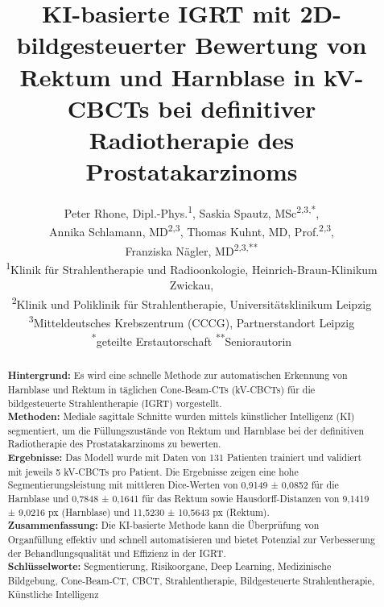 \documentclass{article}
\begin{document}
\title{KI-basierte IGRT mit 2D-bildgesteuerter Bewertung von Rektum und Harnblase in
kV-CBCTs bei definitiver Radiotherapie des Prostatakarzinoms}

\author{%
\begin{minipage}{\textwidth}
\centering
\small
Peter Rhone, Dipl.-Phys.\textsuperscript{1}, 
Saskia Spautz, MSc\textsuperscript{2,3,*},\\ 
Annika Schlamann, MD\textsuperscript{2,3}, 
Thomas Kuhnt, MD, Prof.\textsuperscript{2,3},\\ 
Franziska Nägler, MD\textsuperscript{2,3,**} \\[1ex]
\footnotesize\textsuperscript{1}Klinik für Strahlentherapie und Radioonkologie, Heinrich-Braun-Klinikum Zwickau, \\ 
\footnotesize\textsuperscript{2}Klinik und Poliklinik für Strahlentherapie, Universitätsklinikum Leipzig \\ 
\footnotesize\textsuperscript{3}Mitteldeutsches Krebszentrum (CCCG), Partnerstandort Leipzig \\ 
\footnotesize\textsuperscript{*}geteilte Erstautorschaft
\footnotesize\textsuperscript{**}Seniorautorin
\end{minipage}%
}
\maketitle 

\vspace{0.5cm}

\begin{abstract}
\noindent
\textbf{Hintergrund:} Es wird eine schnelle Methode zur automatischen Erkennung von
Harnblase und Rektum in täglichen Cone-Beam-CTs (kV-CBCTs) für die
bildgesteuerte Strahlentherapie (IGRT) vorgestellt. \\ \textbf{Methoden:}
Mediale sagittale Schnitte wurden mittels künstlicher Intelligenz (KI)
segmentiert, um die Füllungszustände von Rektum und Harnblase bei der definitiven
Radiotherapie des Prostatakarzinoms zu bewerten. \\ \textbf{Ergebnisse:} Das Modell
wurde mit Daten von 131 Patienten trainiert und validiert mit jeweils 5 kV-CBCTs
pro Patient. Die Ergebnisse zeigen eine hohe Segmentierungsleistung mit mittleren
Dice-Werten von 0,9149 ± 0,0852 für die Harnblase und 0,7848 ± 0,1641 für das
Rektum sowie Hausdorff-Distanzen von 9,1419 ± 9,0216 px (Harnblase) und 11,5230 ± 10,5643 px
(Rektum). \\ \textbf{Zusammenfassung:} Die KI-basierte Methode kann die
Überprüfung von Organfüllung effektiv und schnell automatisieren und bietet
Potenzial zur Verbesserung der Behandlungsqualität und Effizienz in der IGRT. \\
\textbf{Schlüsselworte:} Segmentierung, Risikoorgane, Deep Learning, 
Medizinische Bildgebung, Cone-Beam-CT, CBCT, Strahlentherapie, Bildgesteuerte
Strahlentherapie, Künstliche Intelligenz
\end{abstract}
\end{document}

